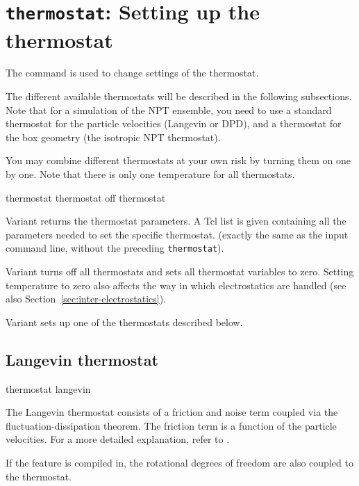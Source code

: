 \section{\texttt{thermostat}: Setting up the thermostat}
\label{sec:thermostat}

The  command is used to change settings of the
thermostat.  

The different available thermostats will be described in the following
subsections. Note that for a simulation of the NPT ensemble, you need
to use a standard thermostat for the particle velocities (\eg Langevin
or DPD), and a thermostat for the box geometry (\eg the isotropic NPT
thermostat).

You may combine different thermostats at your own risk by turning them
on one by one. Note that there is only one temperature for all
thermostats.

\begin{essyntax}
   thermostat
   thermostat off
   thermostat 
\end{essyntax}

Variant  returns the thermostat parameters. A Tcl list is
given containing all the parameters needed to set the specific
thermostat. (exactly the same as the input command line, without the
preceding \texttt{thermostat}).

Variant  turns off all thermostats and sets all thermostat 
variables to zero. Setting temperature to zero also affects the way in which 
electrostatics are handled (see also Section~\ref{sec:inter-electrostatics}).

Variant  sets up one of the thermostats described below.

\subsection{Langevin thermostat}
\begin{essyntax}
  thermostat langevin  
\end{essyntax}

The Langevin thermostat consists of a friction and noise term coupled
via the fluctuation-dissipation theorem. The friction term is a
function of the particle velocities. For a more detailed explanation,
refer to \cite{berendsen84a, grest86a}.

If the feature  is compiled in, the rotational
degrees of freedom are also coupled to the thermostat.

